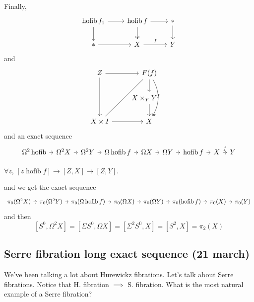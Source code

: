 \documentclass{article}
\DeclareMathOperator{\hofib}{hofib}
\begin{document}
Finally,
\[\begin{tikzcd}
	\hofib f_1\arrow[r]\arrow[d]&\hofib f\arrow[d,two heads]\arrow[r]&*\arrow[d]\\
	*\arrow[r]&X\arrow[r,"f"]&Y
\end{tikzcd}\]
and
\[\begin{tikzcd}
	Z\arrow[dd]\arrow[r]&F(f)\arrow[d]\arrow[dd,bend left,two heads]\\
	&X\times_YY^I\quad\arrow[d]\\
	X\times I\arrow[r]\arrow[uur,dash]&X
\end{tikzcd}\]
and an exact sequence
\[\begin{tikzcd}[column sep=tiny]
	\Omega^2\hofib\arrow[r]&\Omega^2X\arrow[r]&\Omega^2Y\arrow[r]&\Omega\hofib f\arrow[r]&\Omega X\arrow[r]&\Omega Y\arrow[r]&\hofib f\arrow[r]&X\arrow[r,"f"]&Y
\end{tikzcd}\]
\begin{lemma}[Exactness]
	$\forall z$, $[z\hofib f]\to[Z,X]\to[Z,Y]$.
\end{lemma}
and we get the exact sequence
\[\begin{tikzcd}[column sep=tiny]
	\pi_0(\Omega^2X)\arrow[r]&\pi_0(\Omega^2Y)\arrow[r]&\pi_0(\Omega\hofib f)\arrow[r]&\pi_0(\Omega X)\arrow[r]&\pi_0(\Omega Y)\arrow[r]&\pi_0(\hofib f)\arrow[r]&\pi_0(X)\arrow[r]&\pi_0(Y)
\end{tikzcd}\]
and then
\[[S^0,\Omega^2X]=[\Sigma S^0,\Omega X]=[\Sigma^2 S^0,X]=[S^2,X]=\pi_2(X)\]


\subsection{Serre fibration long exact sequence (21 march)}

We've been talking a lot about Hurewickz fibrations. Let's talk about Serre fibrations. Notice that H. fibration $\implies$ S. fibration. What is the most natural example of a Serre fibration?
\end{document}

